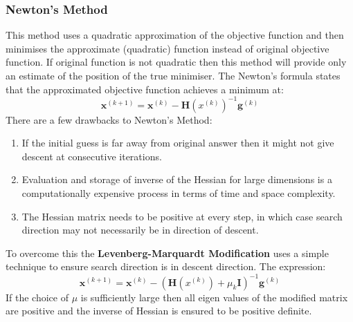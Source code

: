 \documentclass[12pt,a4paper,titlepage]{article}
\begin{document}
\subsubsection{Newton's Method}
This method uses a quadratic approximation of the objective function and then minimises the approximate (quadratic) function instead of original objective function. If original function is not quadratic then this method will provide only an estimate of the position of the true minimiser. The Newton's formula states that the approximated objective function achieves a minimum at:
\begin{equation}
    \textbf{x}^{(k+1)}= \textbf{x}^{(k)}- \textbf{H}(x^{(k)})^{-1}\textbf{g}^{(k)}
\end{equation}
There are a few drawbacks to Newton's Method:
\begin{enumerate}
    \item If the initial guess is far away from original answer then it might not give descent at consecutive iterations.
    \item Evaluation and storage of inverse of the Hessian for large dimensions is a computationally expensive process in terms of time and space complexity.
    \item The Hessian matrix needs to be positive at every step, in which case search direction may not necessarily be in direction of descent.
\end{enumerate}
To overcome this the \textbf{Levenberg-Marquardt Modification} uses a simple technique to ensure search direction is in descent direction. The expression: 
\begin{equation}
    \textbf{x}^{(k+1)}= \textbf{x}^{(k)}- (\textbf{H}(x^{(k)})+\mu_{k}\textbf{I})^{-1}\textbf{g}^{(k)}
\end{equation}
If the choice of $\mu$ is sufficiently large then all eigen values of the modified matrix are positive and the inverse of Hessian is ensured to be positive definite.
\end{document}
